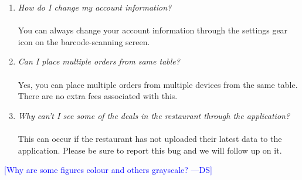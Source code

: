 \documentclass[12pt, titlepage]{article}
\newcommand{\authornote}[3]{\textcolor{#1}{[#3 ---#2]}}
\newcommand{\authornote}[3]{}
\newcommand{\ds}[1]{\authornote{blue}{DS}{#1}}
\begin{document}
\begin{enumerate}
	\item \emph{How do I change my account information?}\\\\
	You can always change your account information through the settings gear icon on the barcode-scanning screen.
	\item \emph{Can I place multiple orders from same table?}\\\\
	Yes, you can place multiple orders from multiple devices from the same table. There are no extra fees associated with this. 
	\item \emph{Why can't I see some of the deals in the restaurant through the application?}\\\\
	This can occur if the restaurant has not uploaded their latest data to the application. Please be sure to report this bug and we will follow up on it.
\end{enumerate}
	

\ds{Why are some figures colour and others grayscale?}
\end{document}

